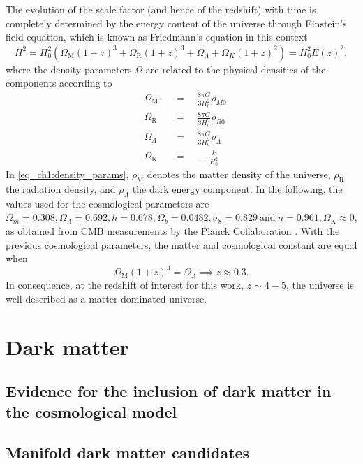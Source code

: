 The evolution of the scale factor (and hence of the redshift) with time is completely determined by the energy content of the universe through Einstein's field equation, which is known as Friedmann's equation in this context
\begin{equation}
    H^2=H_0^2\left( \Omega_\text{M} (1+z)^3+\Omega_\text{R} (1+z)^3 +\Omega_\Lambda + \Omega_K (1+z)^2 \right)=H_0^2E(z)^2,
\end{equation}
where the density parameters $\Omega$ are related to the physical densities of the components according to
\begin{equation}\label{eq_ch1:density_params}
    \begin{aligned}&\Omega_\text{M}&&=\quad\frac{8\pi G}{3H_0^2}\rho_{M0}\\&\Omega_\text{R}&&=\quad\frac{8\pi G}{3H_0^2}\rho_{R0}\\&\Omega_{\Lambda}&&=\quad\frac{8\pi G}{3H_0^2}\rho_{\Lambda}\\&\Omega_\text{K}&&=\quad-\frac k{H_0^2}\end{aligned}
\end{equation}
In \cref{eq_ch1:density_params}, $\rho_\text{M}$ denotes the matter density of the universe, $\rho_\text{R}$ the radiation density, and $\rho_\Lambda$ the dark energy component. In the following, the values used for the cosmological parameters are $\Omega_m=0.308,\Omega_\Lambda=0.692,h=0.678,\Omega_b=0.0482,\sigma_8=0.829\mathrm{~and~}n=0.961, \Omega_\text{K}\approx 0$, as obtained from CMB measurements by the Planck Collaboration \cite{planck2014}. With the previous cosmological parameters, the matter and cosmological constant are equal when
\begin{equation}
    \Omega_\text{M}(1+z)^3=\Omega_\Lambda \implies z\approx 0.3.
\end{equation}
In consequence, at the redshift of interest for this work, $z\sim 4-5$, the universe is well-described as a matter dominated universe.





\section{Dark matter}
\subsection{Evidence for the inclusion of dark matter in the cosmological model}
\subsection{Manifold dark matter candidates}
